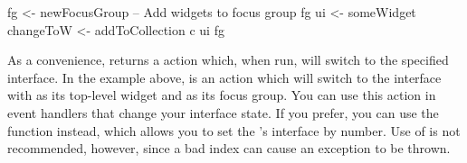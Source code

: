 \begin{haskellcode}
 fg <- newFocusGroup
 -- Add widgets to focus group fg
 ui <- someWidget
 changeToW <- addToCollection c ui fg
\end{haskellcode}

As a convenience,  returns a  action which,
when run, will switch to the specified interface.  In the example
above,  is an action which will switch to the interface
with  as its top-level widget and  as its focus group.
You can use this action in event handlers that change your interface
state.  If you prefer, you can use the  function
instead, which allows you to set the 's interface by
number.  Use of  is not recommended, however,
since a bad index can cause an exception to be thrown.
